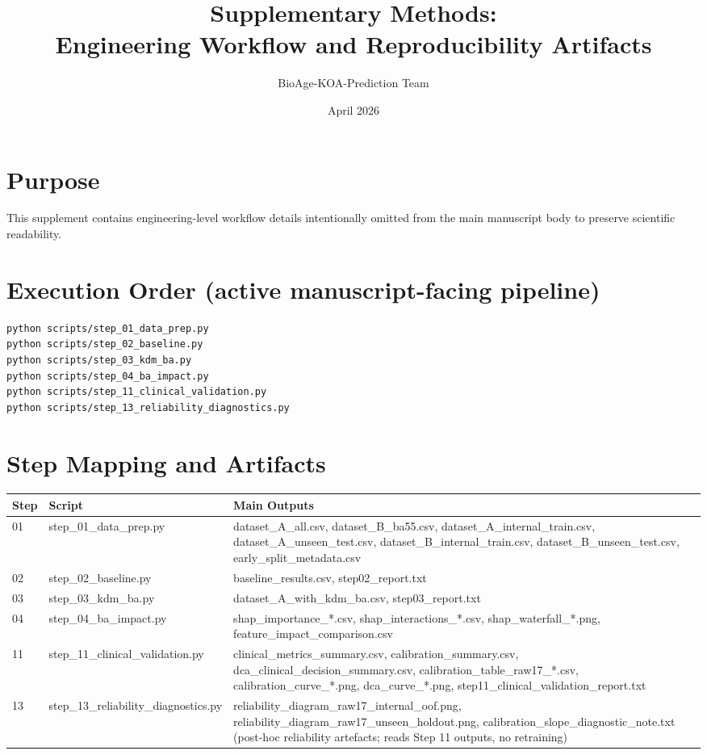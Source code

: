 \documentclass[11pt,a4paper]{article}
\title{Supplementary Methods:\\Engineering Workflow and Reproducibility Artifacts}
\author{BioAge-KOA-Prediction Team}
\date{April 2026}
\begin{document}
\maketitle

\section{Purpose}
This supplement contains engineering-level workflow details intentionally omitted from the main manuscript body to preserve scientific readability.

\section{Execution Order (active manuscript-facing pipeline)}
\begin{verbatim}
python scripts/step_01_data_prep.py
python scripts/step_02_baseline.py
python scripts/step_03_kdm_ba.py
python scripts/step_04_ba_impact.py
python scripts/step_11_clinical_validation.py
python scripts/step_13_reliability_diagnostics.py
\end{verbatim}

\section{Step Mapping and Artifacts}
\begin{longtable}{p{2.1cm}p{4.2cm}p{7.6cm}}
\toprule
Step & Script & Main Outputs \\
\midrule
01 & step\_01\_data\_prep.py & dataset\_A\_all.csv, dataset\_B\_ba55.csv, dataset\_A\_internal\_train.csv, dataset\_A\_unseen\_test.csv, dataset\_B\_internal\_train.csv, dataset\_B\_unseen\_test.csv, early\_split\_metadata.csv \\
02 & step\_02\_baseline.py & baseline\_results.csv, step02\_report.txt \\
03 & step\_03\_kdm\_ba.py & dataset\_A\_with\_kdm\_ba.csv, step03\_report.txt \\
04 & step\_04\_ba\_impact.py & shap\_importance\_*.csv, shap\_interactions\_*.csv, shap\_waterfall\_*.png, feature\_impact\_comparison.csv \\
11 & step\_11\_clinical\_validation.py & clinical\_metrics\_summary.csv, calibration\_summary.csv, dca\_clinical\_decision\_summary.csv, calibration\_table\_raw17\_*.csv, calibration\_curve\_*.png, dca\_curve\_*.png, step11\_clinical\_validation\_report.txt \\
13 & step\_13\_reliability\_diagnostics.py & reliability\_diagram\_raw17\_internal\_oof.png, reliability\_diagram\_raw17\_unseen\_holdout.png, calibration\_slope\_diagnostic\_note.txt (post-hoc reliability artefacts; reads Step 11 outputs, no retraining) \\
\bottomrule
\end{longtable}
\end{document}
